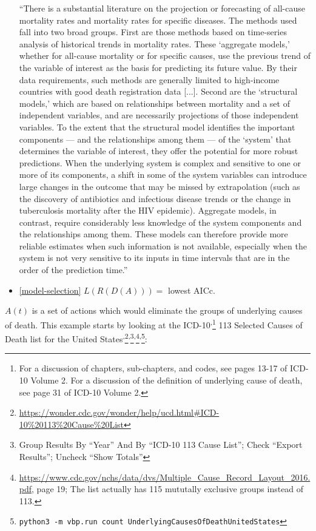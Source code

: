 \documentclass[12pt, a4paper, twocolumn]{article}
\begin{document}
\begin{itemize}
    \enquote{There is a substantial literature on the projection or forecasting of all-cause mortality rates and mortality rates for specific diseases. The methods used fall into two broad groups. First are those methods based on time-series analysis of historical trends in mortality rates. These \enquote{aggregate models,} whether for all-cause mortality or for specific causes, use the previous trend of the variable of interest as the basis for predicting its future value. By their data requirements, such methods are generally limited to high-income countries with good death registration data [...]. Second are the \enquote{structural models,} which are based on relationships between mortality and a set of independent variables, and are necessarily projections of those independent variables. To the extent that the structural model identifies the important components — and the relationships among them — of the \enquote{system} that determines the variable of interest, they offer the potential for more robust predictions. When the underlying system is complex and sensitive to one or more of its components, a shift in some of the system variables can introduce large changes in the outcome that may be missed by extrapolation (such as the discovery of antibiotics and infectious disease trends or the change in tuberculosis mortality after the HIV epidemic). Aggregate models, in contrast, require considerably less knowledge of the system components and the relationships among them. These models can therefore provide more reliable estimates when such information is not available, especially when the system is not very sensitive to its inputs in time intervals that are in the order of the prediction time.}\cite{mathers2006projections}
  \item \eqref{model-selection} $L(R(D(A))) = $ lowest AICc.
\end{itemize}

$A(t)$ is a set of actions which would eliminate the groups of underlying causes of death. This example starts by looking at the ICD-10\cite{icd10vol1,icd10vol2,icd10vol3}\textsuperscript{,}\footnote{For a discussion of chapters, sub-chapters, and codes, see pages 13-17 of ICD-10 Volume 2\cite{icd10vol2}. For a discussion of the definition of underlying cause of death, see page 31 of ICD-10 Volume 2\cite{icd10vol2}.} 113 Selected Causes of Death list for the United States\cite{centers2017underlying}\textsuperscript{,}\footnote{\scriptsize{\url{https://wonder.cdc.gov/wonder/help/ucd.html\#ICD-10\%20113\%20Cause\%20List}}}\textsuperscript{,}\footnote{Group Results By \enquote{Year} And By \enquote{ICD-10 113 Cause List}; Check \enquote{Export Results}; Uncheck \enquote{Show Totals}}\textsuperscript{,}\footnote{\scriptsize{\url{https://www.cdc.gov/nchs/data/dvs/Multiple_Cause_Record_Layout_2016.pdf}, page 19; The list actually has 115 mututally exclusive groups instead of 113.}}\textsuperscript{,}\footnote{\texttt{python3 -m vbp.run count UnderlyingCausesOfDeathUnitedStates}}:
\end{document}
